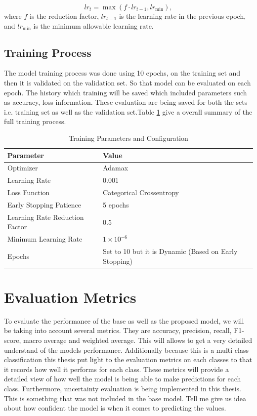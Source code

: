 \documentclass[12pt,onecolumn]{report}
\begin{document}
\begin{equation}
    lr_t = \max(f \cdot lr_{t-1}, lr_{\text{min}}),
\end{equation}
where \(f\) is the reduction factor, \(lr_{t-1}\) is the learning rate in the previous epoch, and \(lr_{\text{min}}\) is the minimum allowable learning rate.

\subsection{Training Process}
The model training process was done using 10 epochs, on the training set and then it is validated on the validation set. So that model can be evaluated on each epoch. The history which training will be saved which included parameters such as accuracy, loss information. These evaluation are being saved for both the sets i.e. training set as well as the validation set.Table \ref{tab:training_parameters} give a overall summary of the full training process.

\begin{table}[h]
    \centering
    \caption{Training Parameters and Configuration}
    \label{tab:training_parameters}
    \begin{tabular}{|l|l|}
        \hline
        \textbf{Parameter} & \textbf{Value} \\
        \hline
        Optimizer          & Adamax \\
        Learning Rate      & 0.001 \\
        Loss Function      & Categorical Crossentropy \\
        Early Stopping Patience & 5 epochs \\
        Learning Rate Reduction Factor & 0.5 \\
        Minimum Learning Rate & \(1 \times 10^{-6}\) \\
        Epochs             & Set to 10 but it is Dynamic (Based on Early Stopping) \\
        \hline
    \end{tabular}
\end{table}

\section{Evaluation Metrics}

To evaluate the performance of the base as well as the proposed model, we will be taking into account several metrics. They are  accuracy, precision, recall, F1-score, macro average and weighted average. This will allows to get a very detailed understand of the models performance. Additionally because this is a multi class classification this thesis put light to the evaluation metrics on each classes to that it records how well it performs for each class. These metrics will provide a detailed view of how well the model is being able to make predictions for each class. Furthermore, uncertainty evaluation is being implemented in this thesis. This is something that was not included in the base model. Tell me give us idea about how confident the model is when it comes to predicting the values.
\end{document}
